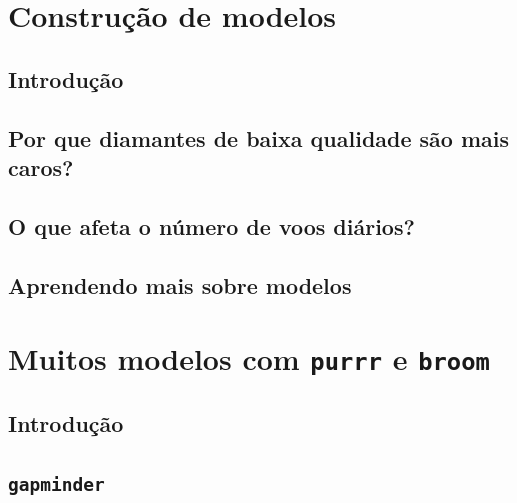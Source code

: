 \documentclass[
]{latex/krantz}
\theoremstyle{definition}
\theoremstyle{definition}
\theoremstyle{definition}
\theoremstyle{definition}
\theoremstyle{remark}
\begin{document}
\hypertarget{construuxe7uxe3o-de-modelos}{%
\chapter{Construção de modelos}\label{construuxe7uxe3o-de-modelos}}

\hypertarget{introduuxe7uxe3o-15}{%
\section{Introdução}\label{introduuxe7uxe3o-15}}

\hypertarget{por-que-diamantes-de-baixa-qualidade-suxe3o-mais-caros}{%
\section{Por que diamantes de baixa qualidade são mais caros?}\label{por-que-diamantes-de-baixa-qualidade-suxe3o-mais-caros}}

\hypertarget{o-que-afeta-o-nuxfamero-de-voos-diuxe1rios}{%
\section{O que afeta o número de voos diários?}\label{o-que-afeta-o-nuxfamero-de-voos-diuxe1rios}}

\hypertarget{aprendendo-mais-sobre-modelos}{%
\section{Aprendendo mais sobre modelos}\label{aprendendo-mais-sobre-modelos}}

\hypertarget{muitos-modelos-com-purrr-e-broom}{%
\chapter{\texorpdfstring{Muitos modelos com \texttt{purrr} e \texttt{broom}}{Muitos modelos com purrr e broom}}\label{muitos-modelos-com-purrr-e-broom}}

\hypertarget{introduuxe7uxe3o-16}{%
\section{Introdução}\label{introduuxe7uxe3o-16}}

\hypertarget{gapminder}{%
\section{\texorpdfstring{\texttt{gapminder}}{gapminder}}\label{gapminder}}
\end{document}
